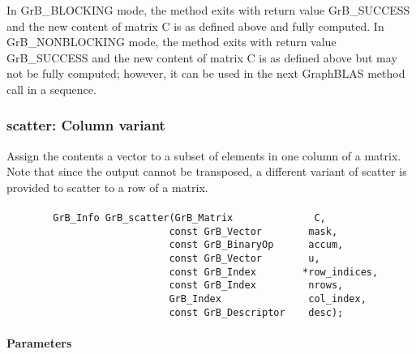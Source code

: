 In {\sf GrB\_BLOCKING} mode, the method exits with return value 
{\sf GrB\_SUCCESS} and the new content of matrix {\sf C} is as defined above
and fully computed.  
In {\sf GrB\_NONBLOCKING} mode, the method exits with return value 
{\sf GrB\_SUCCESS} and the new content of matrix {\sf C} is as defined above 
but may not be fully computed; however, it can be used in the next GraphBLAS 
method call in a sequence.

\subsubsection{{\sf scatter}: Column variant}

Assign the contents a vector to a subset of elements in one column of a matrix. 
Note that since the output cannot be transposed, a different variant of
{\sf scatter} is provided to scatter to a row of a matrix.

\paragraph{\syntax}

\begin{verbatim}
        GrB_Info GrB_scatter(GrB_Matrix              C,
                            const GrB_Vector        mask,
                            const GrB_BinaryOp      accum,
                            const GrB_Vector        u,
                            const GrB_Index        *row_indices,
                            const GrB_Index         nrows,
                            GrB_Index               col_index,
                            const GrB_Descriptor    desc); 
\end{verbatim}

\paragraph{Parameters}

